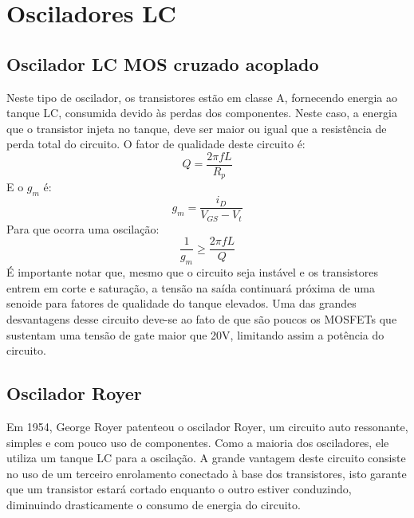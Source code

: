 \chapter{Osciladores LC}
\label{osciladores-lc}
\section{Oscilador LC MOS cruzado acoplado}
Neste tipo de oscilador, os transistores estão em classe A, fornecendo energia ao tanque LC, consumida devido às perdas dos componentes. Neste caso, a energia que o transistor injeta no tanque, deve ser maior ou igual que a resistência de perda total do circuito. O fator de qualidade deste circuito é:
\begin{equation}
Q = \frac{2\pi f L}{R_p}
\end{equation}
E o $g_m$ é:
\begin{equation}
g_m = \frac{i_D}{V_{GS} - V_t}
\end{equation}
Para que ocorra uma oscilação:
\begin{equation}
\frac{1}{g_m} \geq \frac{2\pi f L}{Q}
\end{equation}
É importante notar que, mesmo que o circuito seja instável e os transistores entrem em corte e saturação, a tensão na saída continuará próxima de uma senoide para fatores de qualidade do tanque elevados.
Uma das grandes desvantagens desse circuito deve-se ao fato de que são poucos os MOSFETs que sustentam uma tensão de gate maior que 20V, limitando assim a potência do circuito.


\section{Oscilador Royer}
Em 1954, George Royer patenteou o oscilador Royer, um circuito auto ressonante, simples e com pouco uso de componentes. Como a maioria dos osciladores, ele utiliza um tanque LC para a oscilação. A grande vantagem deste circuito consiste no uso de um terceiro enrolamento conectado à base dos transistores, isto garante que um transistor estará cortado enquanto o outro estiver conduzindo, diminuindo drasticamente o consumo de energia do circuito.


